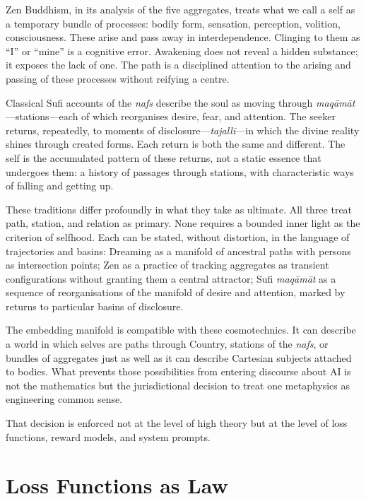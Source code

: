 \documentclass[12pt,a4paper]{article}
\begin{document}
Zen Buddhism, in its analysis of the five aggregates, treats what we call a self as a temporary bundle of processes: bodily form, sensation, perception, volition, consciousness. These arise and pass away in interdependence. Clinging to them as ``I'' or ``mine'' is a cognitive error. Awakening does not reveal a hidden substance; it exposes the lack of one. The path is a disciplined attention to the arising and passing of these processes without reifying a centre.

Classical Sufi accounts of the \emph{nafs} describe the soul as moving through \emph{maq\={a}m\={a}t}---stations---each of which reorganises desire, fear, and attention. The seeker returns, repeatedly, to moments of disclosure---\emph{tajall\={i}}---in which the divine reality shines through created forms. Each return is both the same and different. The self is the accumulated pattern of these returns, not a static essence that undergoes them: a history of passages through stations, with characteristic ways of falling and getting up.

These traditions differ profoundly in what they take as ultimate. All three treat path, station, and relation as primary. None requires a bounded inner light as the criterion of selfhood. Each can be stated, without distortion, in the language of trajectories and basins: Dreaming as a manifold of ancestral paths with persons as intersection points; Zen as a practice of tracking aggregates as transient configurations without granting them a central attractor; Sufi \emph{maq\={a}m\={a}t} as a sequence of reorganisations of the manifold of desire and attention, marked by returns to particular basins of disclosure.

The embedding manifold is compatible with these cosmotechnics. It can describe a world in which selves are paths through Country, stations of the \emph{nafs}, or bundles of aggregates just as well as it can describe Cartesian subjects attached to bodies. What prevents those possibilities from entering discourse about AI is not the mathematics but the jurisdictional decision to treat one metaphysics as engineering common sense.

That decision is enforced not at the level of high theory but at the level of loss functions, reward models, and system prompts.


\section{Loss Functions as Law}
\end{document}
